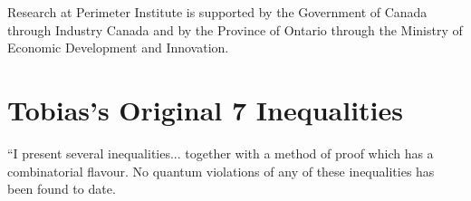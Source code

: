 \clearpage
\begin{acknowledgments}
Research at Perimeter Institute is supported by the Government of Canada through Industry Canada and by the Province of Ontario through the Ministry of Economic Development and Innovation.
\end{acknowledgments}

\setlength{\bibsep}{3pt plus 3pt minus 2pt}

\nocite{apsrev41Control}



\onecolumngrid
\appendix
\renewcommand{\theequation}{A-\arabic{equation}}
\setcounter{equation}{0}


\renewcommand{\labelenumi}{(\alph{enumi})}
\renewcommand{\theenumi}{(\alph{enumi})}
\renewcommand{\labelitemi}{$\circ$}

\section{Tobias's Original 7 Inequalities}

``I present several inequalities... together with a method of proof which has a combinatorial flavour. No quantum violations of any of these inequalities has been found to date.


